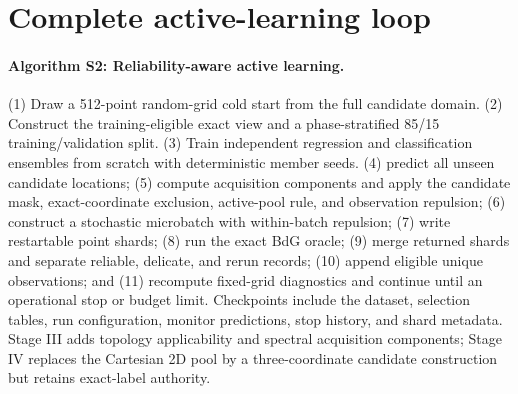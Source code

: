 \section{Complete active-learning loop}
\paragraph{Algorithm S2: Reliability-aware active learning.}
(1) Draw a 512-point random-grid cold start from the full candidate domain. (2) Construct the training-eligible exact view and a phase-stratified 85/15 training/validation split. (3) Train independent regression and classification ensembles from scratch with deterministic member seeds. (4) predict all unseen candidate locations; (5) compute acquisition components and apply the candidate mask, exact-coordinate exclusion, active-pool rule, and observation repulsion; (6) construct a stochastic microbatch with within-batch repulsion; (7) write restartable point shards; (8) run the exact BdG oracle; (9) merge returned shards and separate reliable, delicate, and rerun records; (10) append eligible unique observations; and (11) recompute fixed-grid diagnostics and continue until an operational stop or budget limit.  Checkpoints include the dataset, selection tables, run configuration, monitor predictions, stop history, and shard metadata. Stage III adds topology applicability and spectral acquisition components; Stage IV replaces the Cartesian 2D pool by a three-coordinate candidate construction but retains exact-label authority.

